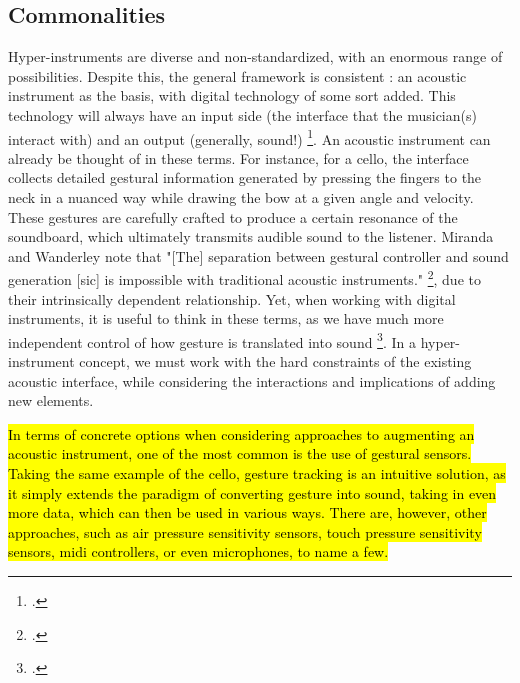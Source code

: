 \documentclass[12pt,twoside,maitrise]{dms_ks}
\theoremstyle{definition}
\begin{document}
\subsection{Commonalities}

Hyper-instruments are diverse and non-standardized, with an enormous range of possibilities.  
Despite this, the general framework is consistent : an acoustic instrument as the basis, with digital technology of some sort added. 
This technology will always have an input side (the interface that the musician(s) interact with) and an output (generally, sound!) \footcite[3]{miranda_new_2006}. 
An acoustic instrument can already be thought of in these terms.
For instance, for a cello, the interface collects detailed gestural information generated by pressing the fingers to the neck in a nuanced way while drawing the bow at a given angle and velocity. 
These gestures are carefully crafted to produce a certain resonance of the soundboard, which ultimately transmits audible sound to the listener. 
Miranda and Wanderley note that "[The] separation between gestural controller and sound generation [sic] is impossible with traditional acoustic instruments." \footcite[3]{miranda_new_2006}, due to their intrinsically dependent relationship.
Yet, when working with digital instruments, it is useful to think in these terms, as we have much more independent control of how gesture is translated into sound \footcite[24--25]{jorda_digital_2005}.
In a hyper-instrument concept, we must work with the hard constraints of the existing acoustic interface, while considering the interactions and implications of adding new elements. 

\hl{In terms of concrete options when considering approaches to augmenting an acoustic instrument, one of the most common is the use of gestural sensors. 
Taking the same example of the cello, gesture tracking is an intuitive solution, as it simply extends the paradigm of converting gesture into sound, taking in even more data, which can then be used in various ways. 
There are, however, other approaches, such as air pressure sensitivity sensors, touch pressure sensitivity sensors, midi controllers, or even microphones, to name a few.} 
\end{document}
